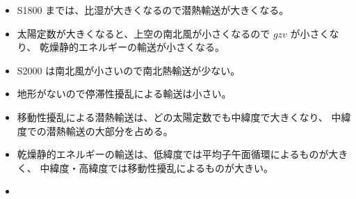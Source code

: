 \documentclass[body]{subfiles}
\begin{document}
\begin{itemize}
	\item S1800 までは、比湿が大きくなるので潜熱輸送が大きくなる。
	\item 太陽定数が大きくなると、上空の南北風が小さくなるので \(gzv\) が小さくなり、
		乾燥静的エネルギーの輸送が小さくなる。
	\item S2000 は南北風が小さいので南北熱輸送が少ない。
	\item 地形がないので停滞性擾乱による輸送は小さい。
	\item 移動性擾乱による潜熱輸送は、どの太陽定数でも中緯度で大きくなり、
		中緯度での潜熱輸送の大部分を占める。
	\item 乾燥静的エネルギーの輸送は、低緯度では平均子午面循環によるものが大きく、
		中緯度・高緯度では移動性擾乱によるものが大きい。
\end{itemize}

\begin{itemize}
	\item 
\end{itemize}
\end{document}
